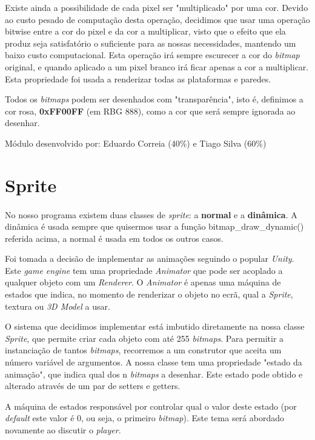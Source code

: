 \documentclass{report}
\begin{document}
Existe ainda a possibilidade de cada pixel ser "multiplicado" por uma cor. Devido ao custo pesado de computação desta operação, decidimos que usar uma operação bitwise entre a cor do pixel e da cor a multiplicar, visto que o efeito que ela produz seja satisfatório o suficiente para as nossas necessidades, mantendo um baixo custo computacional. Esta operação irá sempre escurecer a cor do \textit{bitmap} original, e quando aplicado a um pixel branco irá ficar apenas a cor a multiplicar. Esta propriedade foi usada a renderizar todas as plataformas e paredes. 

Todos os \textit{bitmaps} podem ser desenhados com "transparência", isto é, definimos a cor rosa, \textbf{0xFF00FF} (em RBG 888), como a cor que será sempre ignorada ao desenhar. \newline

Módulo desenvolvido por: Eduardo Correia (40\%) e Tiago Silva (60\%)
 
\section{Sprite}

\paragraph{}
No nosso programa existem duas classes de \textit{sprite}: a \textbf{normal} e a \textbf{dinâmica}. A dinâmica é usada sempre que quisermos usar a função bitmap\_draw\_dynamic() referida acima, a normal é usada em todos os outros casos.

Foi tomada a decisão de implementar as animações seguindo o popular \textit{Unity}. Este \textit{game engine} tem uma propriedade \textit{Animator} que pode ser acoplado a qualquer objeto com um \textit{Renderer}. O \textit{Animator} é apenas uma máquina de estados que indica, no momento de renderizar o objeto no ecrã, qual a \textit{Sprite}, textura ou \textit{3D Model} a usar.

O sistema que decidimos implementar está imbutido diretamente na nossa classe \textit{Sprite}, que permite criar cada objeto com até 255 \textit{bitmaps}. Para permitir a instanciação de tantos \textit{bitmaps}, recorremos a um construtor que aceita um número variável de argumentos. A nossa classe tem uma propriedade "estado da animação", que indica qual dos n \textit{bitmaps} a desenhar. Este estado pode obtido e alterado através de um par de setters e getters.

A máquina de estados responsável por controlar qual o valor deste estado (por \textit{default} este valor é 0, ou seja, o primeiro \textit{bitmap}). Este tema será abordado novamente ao discutir o \textit{player}.
\end{document}
